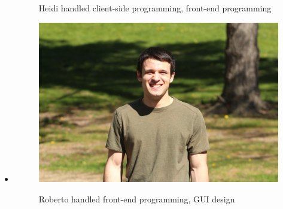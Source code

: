 \documentclass{article}
\begin{document}
\begin{minipage}{0.45\textwidth}
\begin{itemize}[label={}]
\begin{figure}[H]
  							\captionsetup{labelformat=empty}
  							\caption{Heidi handled  client-side programming, front-end programming
  										}
  					\end{figure}
  				\item
  					\begin{figure}[H]
  						\includegraphics[scale=.07]{roberto.jpg}\\
  							\captionsetup{labelformat=empty}
  							\caption{Roberto handled front-end programming, GUI design}
  					\end{figure}
			\end{itemize}
		\end{minipage}
		\hfill
\end{document}
